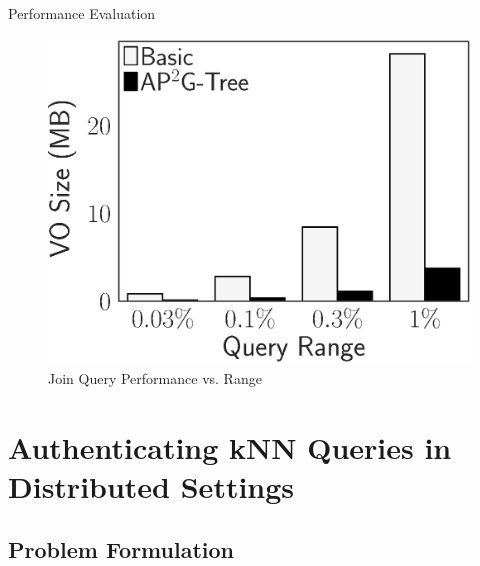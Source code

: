 \documentclass[xcolor={dvipsnames},aspectratio=169,10pt]{beamer}
\begin{document}
\begin{frame}{Performance Evaluation}
\begin{figure}
    \includegraphics[height=\ht\figbox]{exp-figs/access-control/join_vo.eps}
    \caption{Join Query Performance vs. Range}
  \end{figure}
\end{frame}

\section{Authenticating {kNN} Queries in Distributed Settings}

\subsection{Problem Formulation}
\end{document}
